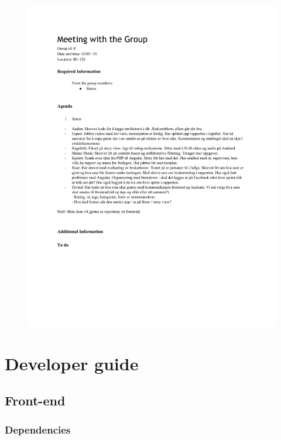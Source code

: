 \begin{appendices}
	\begin{figure}[h]
		\centering
		\includegraphics[trim=2.5cm 6.5cm 2cm 2.5cm,clip, scale=0.9]{pdffig/group_meeting}
		\label{app:group_meeting}
	\end{figure}
	

	

\chapter{Developer guide}
\label{app:developer_guide}

\section{Front-end}

\subsection{Dependencies}


\end{appendices}
